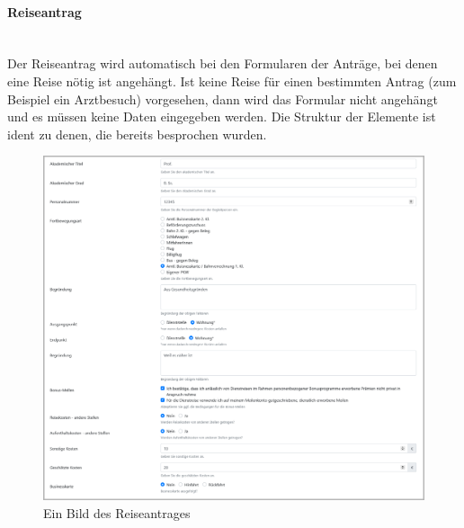 \paragraph{Reiseantrag}
~\\
Der Reiseantrag wird automatisch bei den Formularen der Anträge, bei denen eine Reise nötig ist angehängt. Ist keine Reise für einen bestimmten Antrag (zum Beispiel ein Arztbesuch) vorgesehen, dann wird das Formular nicht angehängt und es müssen keine  Daten eingegeben werden. Die Struktur der Elemente ist ident zu denen, die bereits besprochen wurden.
\begin{figure}[H]
	\centering
	\includegraphics[width=1\linewidth]{images/ldehner_implementierung/zusatz_1}
	\caption[Reiseantrag]{Ein Bild des Reiseantrages}
	\label{fig:zusatz1}
\end{figure}

